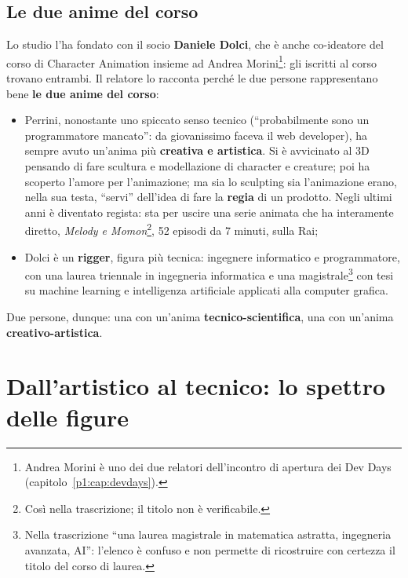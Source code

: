 \subsection{Le due anime del corso}

Lo studio l'ha fondato con il socio \textbf{Daniele Dolci}, che è anche
co-ideatore del corso di Character Animation insieme ad Andrea
Morini\footnote{Andrea Morini è uno dei due relatori dell'incontro di
apertura dei Dev Days (capitolo~\ref{p1:cap:devdays}).}: gli iscritti al
corso trovano entrambi. Il relatore lo racconta perché le due persone
rappresentano bene \textbf{le due anime del corso}:
\begin{itemize}
  \item Perrini, nonostante uno spiccato senso tecnico (``probabilmente sono
        un programmatore mancato'': da giovanissimo faceva il web developer),
        ha sempre avuto un'anima più \textbf{creativa e artistica}. Si è
        avvicinato al 3D pensando di fare scultura e modellazione di
        character e creature; poi ha scoperto l'amore per l'animazione; ma
        sia lo sculpting sia l'animazione erano, nella sua testa, ``servi''
        dell'idea di fare la \textbf{regia} di un prodotto. Negli ultimi anni
        è diventato regista: sta per uscire una serie animata che ha
        interamente diretto, \emph{Melody e Momon}\footnote{Così nella
        trascrizione; il titolo non è verificabile.}, 52 episodi da 7
        minuti, sulla Rai;
  \item Dolci è un \textbf{rigger}, figura più tecnica: ingegnere informatico
        e programmatore, con una laurea triennale in ingegneria informatica e
        una magistrale\footnote{Nella trascrizione ``una laurea magistrale in
        matematica astratta, ingegneria avanzata, AI'': l'elenco è confuso e
        non permette di ricostruire con certezza il titolo del corso di
        laurea.} con tesi su machine learning e intelligenza artificiale
        applicati alla computer grafica.
\end{itemize}
Due persone, dunque: una con un'anima \textbf{tecnico-scientifica}, una con
un'anima \textbf{creativo-artistica}.

\section{Dall'artistico al tecnico: lo spettro delle figure}
\label{p4:sec:spettro}

